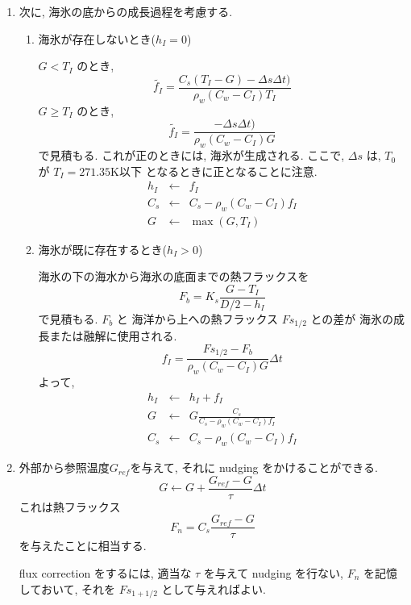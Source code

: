 \begin{enumerate}
\item 次に, 海氷の底からの成長過程を考慮する.

\begin{enumerate}
\item 海氷が存在しないとき($h_I=0$)

$G <  T_I$ のとき, 
\begin{equation}
  \tilde{f_I}
  =  \frac{C_s ( T_I - G ) - \Delta s \Delta t )}
          {\rho_w ( C_w - C_I ) T_I }
\end{equation}
$G \ge T_I$ のとき, 
\begin{equation}
  \tilde{f_I}
  =  \frac{- \Delta s \Delta t )}
          {\rho_w ( C_w - C_I ) G}
\end{equation}
で見積もる.
これが正のときには, 海氷が生成される.
ここで,  $\Delta s$ は, $T_0$ が $T_I=271.35$K以下
となるときに正となることに注意.
\begin{eqnarray}
  h_I & \leftarrow & f_I \\
  C_s & \leftarrow & C_s - \rho_w ( C_w - C_I ) f_I \\
  G   & \leftarrow & \max( G, T_I )
\end{eqnarray}

\item 海氷が既に存在するとき($h_I>0$)

海氷の下の海水から海氷の底面までの熱フラックスを
\begin{equation}
  F_b = K_s \frac{ G - T_I }{ D/2 - h_I }
\end{equation}
で見積もる.
$F_b$ と 海洋から上への熱フラックス $Fs_{1/2}$ との差が
海氷の成長または融解に使用される.
\begin{equation}
  f_I = \frac{ Fs_{1/2} - F_b }
             { \rho_w ( C_w - C_I ) G } \Delta t
\end{equation}
よって,
\begin{eqnarray}
  h_I & \leftarrow & h_I + f_I \\
  G   & \leftarrow & G \frac{C_s}{C_s - \rho_w ( C_w - C_I ) f_I} \\
  C_s & \leftarrow & C_s - \rho_w ( C_w - C_I ) f_I
\end{eqnarray}
\end{enumerate}

\item 外部から参照温度$G_{ref}$を与えて,
      それに nudging をかけることができる.
%      
      \begin{equation}
        G \leftarrow G + \frac{G_{ref} - G}{\tau} \Delta t
      \end{equation}
%
      これは熱フラックス 
      \begin{equation}
        F_n = C_s \frac{G_{ref} - G}{\tau}
      \end{equation}
      を与えたことに相当する.

      flux correction をするには,
      適当な $\tau$ を与えて nudging を行ない,
      $F_n$ を記憶しておいて,
      それを $Fs_{1+1/2}$ として与えればよい.

\end{enumerate}



